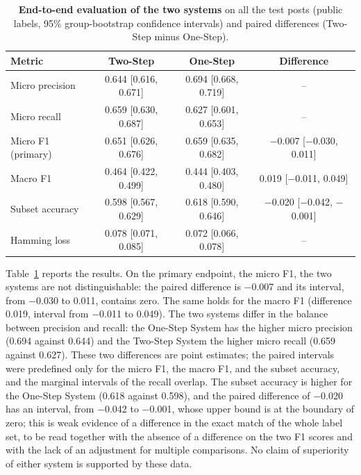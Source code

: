 \begin{table}
    \centering
    \caption{\textbf{End-to-end evaluation of the two systems} on all the test posts (public labels, 95{\%} group-bootstrap confidence intervals) and paired differences (Two-Step minus One-Step).}
    \label{tab:system-end-to-end}
    \small
    \begin{tabular}{lccc}
        \hline
        \textbf{Metric} & \textbf{Two-Step} & \textbf{One-Step} & \textbf{Difference} \\
        \hline
        Micro precision & 0.644 [0.616, 0.671] & 0.694 [0.668, 0.719] & -- \\
        Micro recall & 0.659 [0.630, 0.687] & 0.627 [0.601, 0.653] & -- \\
        Micro F1 (primary) & 0.651 [0.626, 0.676] & 0.659 [0.635, 0.682] & $-$0.007 [$-$0.030, 0.011] \\
        Macro F1 & 0.464 [0.422, 0.499] & 0.444 [0.403, 0.480] & 0.019 [$-$0.011, 0.049] \\
        Subset accuracy & 0.598 [0.567, 0.629] & 0.618 [0.590, 0.646] & $-$0.020 [$-$0.042, $-$0.001] \\
        Hamming loss & 0.078 [0.071, 0.085] & 0.072 [0.066, 0.078] & -- \\
        \hline
    \end{tabular}
\end{table}

Table~\ref{tab:system-end-to-end} reports the results. On the primary endpoint, the micro F1, the two systems are not distinguishable: the paired difference is $-$0.007 and its interval, from $-$0.030 to 0.011, contains zero. The same holds for the macro F1 (difference 0.019, interval from $-$0.011 to 0.049). The two systems differ in the balance between precision and recall: the One-Step System has the higher micro precision (0.694 against 0.644) and the Two-Step System the higher micro recall (0.659 against 0.627). These two differences are point estimates; the paired intervals were predefined only for the micro F1, the macro F1, and the subset accuracy, and the marginal intervals of the recall overlap. The subset accuracy is higher for the One-Step System (0.618 against 0.598), and the paired difference of $-$0.020 has an interval, from $-$0.042 to $-$0.001, whose upper bound is at the boundary of zero; this is weak evidence of a difference in the exact match of the whole label set, to be read together with the absence of a difference on the two F1 scores and with the lack of an adjustment for multiple comparisons. No claim of superiority of either system is supported by these data.

